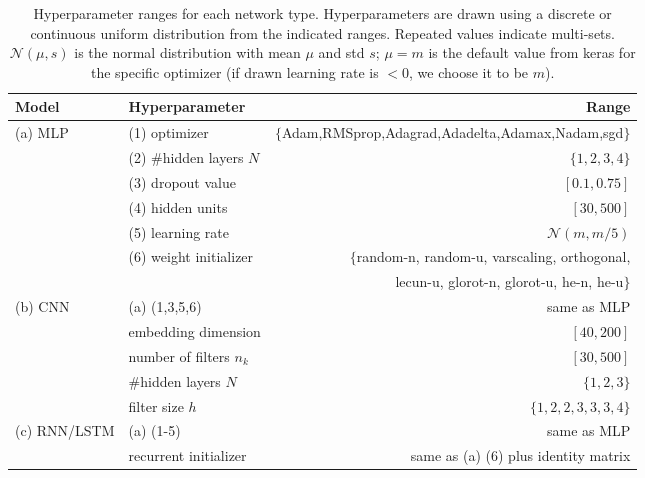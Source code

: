 \begin{table*}[htb]
  \centering
  {\small
  \begin{tabular}{llr}
  \toprule
    Model & Hyperparameter & Range \\ \toprule
    (a) MLP & (1) optimizer & $\{$Adam,RMSprop,Adagrad,Adadelta,Adamax,Nadam,sgd$\}$ \\
    & (2) \#hidden layers $N$ & $\{1,2,3,4\}$\\
    & (3) dropout value & $[0.1,0.75]$ \\
    & (4) hidden units & $[30,500]$ \\
    & (5) learning rate & $\mathcal{N}(m,m/5)$\\
    & (6) weight initializer & $\{$random-n, random-u, varscaling, orthogonal, \\
    & & lecun-u, glorot-n, glorot-u, he-n, he-u$\}$\\
    \midrule
     (b) CNN        & (a) (1,3,5,6) & same as MLP \\
             & embedding dimension & $[40,200]$\\
     & number of filters $n_k$ & $[30,500]$\\
             & \#hidden layers $N$ & $\{1,2,3\}$\\
             & filter size $h$ & $\{1,2,2,3,3,3,4\}$\\
    \midrule
      (c) RNN/LSTM & (a) (1-5) & same as MLP \\
     & recurrent initializer & same as (a) (6) plus identity matrix\\
    \midrule
  \end{tabular}
  \caption{Hyperparameter ranges for each network type. Hyperparameters are drawn using a discrete or continuous uniform distribution from the indicated ranges. Repeated values indicate multi-sets. $\mathcal{N}(\mu,s)$ is the normal distribution with mean $\mu$ and std $s$; $\mu=m$ is the default value from keras for the specific optimizer (if drawn learning rate is $<0$, we choose it to be $m$).}
  \label{table:hyperparams_sent}
  }
\end{table*}